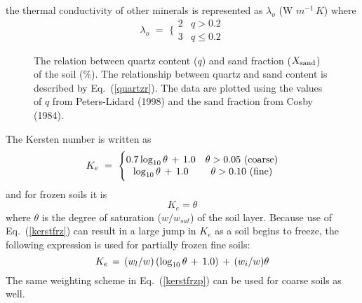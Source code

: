 the thermal conductivity of other minerals is represented as
$\lambda_o$ (W ${m^{-1}\,K}$) where
%
\begin{equation}
%
\lambda_o \,\, = \,\, \Bigg\lbrace
%
\begin{matrix}
2 & q > 0.2
\\
3 & q \leq 0.2
%
\end{matrix}
%
\end{equation}
%
\begin{figure}[h]
		 \begin{center}
		 \caption{The relation between quartz content ($q$) and
sand fraction ($X_{\rm sand}$) of the soil (\%).
The relationship between quartz and sand content
is described by Eq.~(\ref{quartzr}).
The data are plotted using the values of $q$ from
Peters-Lidard \etal (1998) and the sand fraction
from Cosby \etal (1984).}
\label{quartzf}
		 \end{center}
\end{figure}
\nocite{Cosby1984}


The Kersten number is written as
%
%
\begin{equation}
%
K_e \,\, = \,\, \Bigg\lbrace
%
\begin{matrix}
0.7 \, {\rm log}_{10}\,\theta \,+\,1.0 & 
\theta > 0.05 \,\, ({\rm coarse})
\\
{\rm log}_{10}\,\theta \,+\,1.0 & 
\theta > 0.10 \,\, ({\rm fine})
%
\end{matrix}
%
\end{equation}
%
and for frozen soils it is
%
\begin{equation}\label{kerstfrz}
K_e = \theta 
\end{equation}
%
where $\theta$ is the degree of saturation ($w/w_{sat}$) of the soil
layer. Because use of Eq.~(\ref{kerstfrz}) can result in
a large jump in $K_e$ as a soil begins to freeze, the following expression
is used for partially frozen fine soils:
%
\begin{equation}\label{kerstfrzp}
K_e \, = \, (w_l/w)\left({\rm log}_{10}\,\theta\,+\,1.0\right)
 \,+\, (w_i/w)\theta
\end{equation}
%
The same weighting scheme in Eq.~(\ref{kerstfrzp})
can be used for coarse soils as well. 

